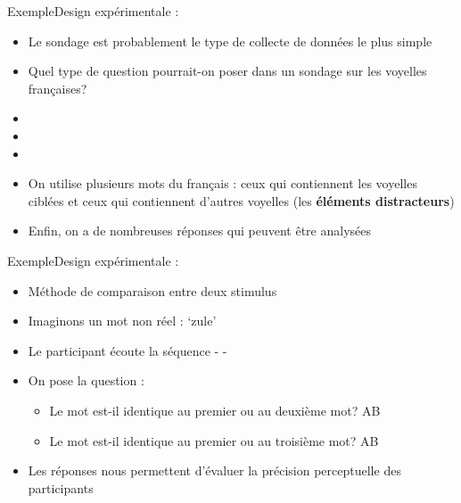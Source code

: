\documentclass[xcolor=dvipsnames, mathserif, 10pt, aspectratio=169, handout]{beamer}
\begin{document}

\begin{frame}{Exemple}{Design expérimentale : }

\begin{itemize}
	\item Le sondage est probablement le type de collecte de données le plus simple 
	\item[\winner] Quel type de question pourrait-on poser dans un sondage sur les voyelles françaises?
	
	\pause
	\item[]
	\item[] 
	\item[]
	
	\pause
	
	\item On utilise plusieurs mots du français : ceux qui contiennent les voyelles ciblées et ceux qui contiennent d'autres voyelles (les \textbf{éléments distracteurs})
	\item[\winner] Enfin, on a de nombreuses réponses qui peuvent être analysées
\end{itemize}
	
\end{frame}



\begin{frame}{Exemple}{Design expérimentale : }

\begin{itemize}
	\item Méthode de comparaison entre deux stimulus  
	\item Imaginons un mot non réel : `zule' 

\pause
	\item Le participant écoute la séquence  -  - 
	\item[\winner] On pose la question :
	
	\begin{itemize}
		\item Le  mot est-il identique au premier ou au deuxième mot?   \hfill AB

\pause
		\item Le  mot est-il identique au premier ou au troisième mot?   \hfill AB
	\end{itemize}
	
\pause
	
	\item Les réponses nous permettent d'évaluer la précision perceptuelle des participants
	
\end{itemize}
	
\end{frame}
\end{document}

